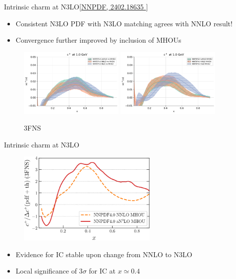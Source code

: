 \documentclass[aspectratio=43, 8pt,t]{beamer}
\begin{document}
\begin{frame}{Intrinsic charm at N3LO}{\color{gray}\footnotesize [\hyperlink{https://arxiv.org/abs/2402.18635 }{NNPDF, 2402.18635 }]}
  \begin{itemize}
    \item Consistent N3LO PDF with N3LO matching agrees with NNLO result!
    \item Convergence further improved by inclusion of MHOUs
  \end{itemize}

  \begin{figure}
    \includegraphics[width=0.45\textwidth]{n3lo_charm.pdf}
    \includegraphics[width=0.45\textwidth]{n3lo_charm_mhou.pdf}
    \caption*{3FNS}
  \end{figure}
\end{frame}

\begin{frame}{Intrinsic charm at N3LO}
  \begin{figure}
    \includegraphics[width=0.6\textwidth]{IC-Significance-N3LO.pdf}
  \end{figure}
  \begin{itemize}
    \item Evidence for IC stable upon change from NNLO to N3LO
    \item Local significance of 3$\sigma$ for IC at $x\simeq 0.4$
  \end{itemize}
\end{frame}
\end{document}
